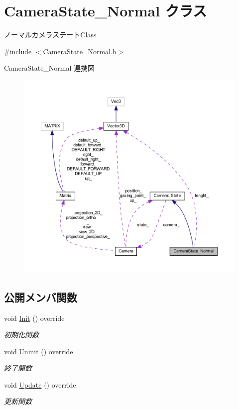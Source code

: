 \hypertarget{class_camera_state___normal}{}\section{Camera\+State\+\_\+\+Normal クラス}
\label{class_camera_state___normal}


ノーマルカメラステート\+Class  




{\ttfamily \#include $<$Camera\+State\+\_\+\+Normal.\+h$>$}



Camera\+State\+\_\+\+Normal 連携図\nopagebreak
\begin{figure}[H]
\begin{center}
\leavevmode
\includegraphics[width=350pt]{class_camera_state___normal__coll__graph}
\end{center}
\end{figure}
\subsection*{公開メンバ関数}
\begin{DoxyCompactItemize}
\item 
void \mbox{\hyperlink{class_camera_state___normal_a9e08312abffe36e42e53decdd015f079}{Init}} () override
\begin{DoxyCompactList}\small\item\em 初期化関数 \end{DoxyCompactList}\item 
void \mbox{\hyperlink{class_camera_state___normal_a456267d93f83419f635c6e5c692a79bd}{Uninit}} () override
\begin{DoxyCompactList}\small\item\em 終了関数 \end{DoxyCompactList}\item 
void \mbox{\hyperlink{class_camera_state___normal_a52b73e55084b36b1d085b62dc8f15b0a}{Update}} () override
\begin{DoxyCompactList}\small\item\em 更新関数 \end{DoxyCompactList}\end{DoxyCompactItemize}
